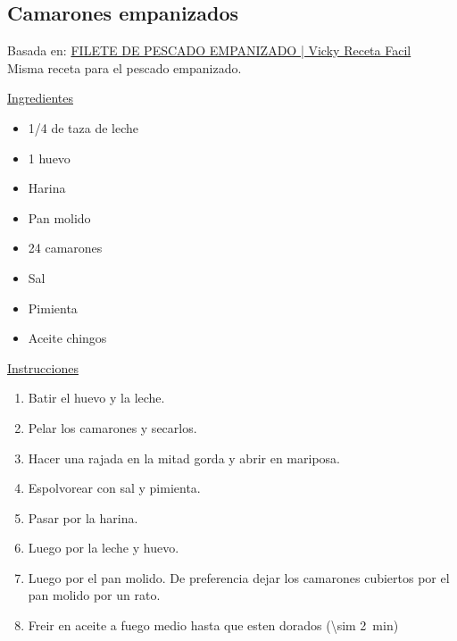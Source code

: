 \subsection{Camarones empanizados}

Basada en: \href{https://www.youtube.com/watch?v=1pj0MG30yls}{FILETE DE PESCADO EMPANIZADO | Vicky Receta Facil}\\

Misma receta para el pescado empanizado.

\underline{Ingredientes}
\begin{itemize}
\item \num{1/4} de taza de leche
\item 1 huevo
\item Harina
\item Pan molido
\item 24 camarones
\item Sal
\item Pimienta
\item Aceite chingos
\end{itemize}

\underline{Instrucciones}
\begin{enumerate}
\item Batir el huevo y la leche.
\item Pelar los camarones y secarlos.
\item Hacer una rajada en la mitad gorda y abrir en mariposa.
\item Espolvorear con sal y pimienta.
\item Pasar por la harina.
\item Luego por la leche y huevo.
\item Luego por el pan molido. De preferencia dejar los camarones cubiertos por el pan molido por un rato.
\item Freir en aceite a fuego medio hasta que esten dorados (\SI{\sim 2}{min})
\end{enumerate}
